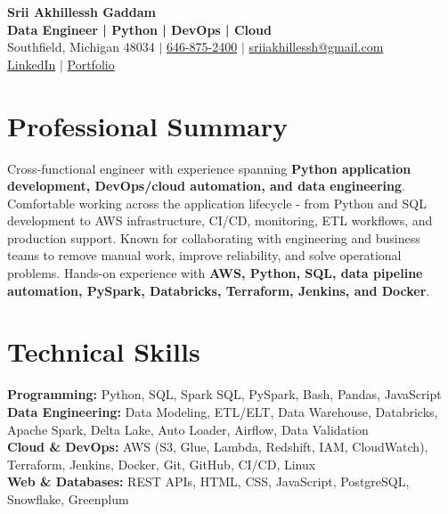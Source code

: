 \documentclass[letterpaper,10pt]{article}
\begin{document}
\fontsize{9.35pt}{10.45pt}\selectfont

\begin{center}
    {\LARGE \textbf{Srii Akhillessh Gaddam}} \\[-1pt]
    \textbf{Data Engineer | Python | DevOps | Cloud} \\[2pt]
    Southfield, Michigan 48034 $|$
    \href{tel:6468752400}{646-875-2400} $|$
    \href{mailto:sriiakhillessh@gmail.com}{sriiakhillessh@gmail.com} \\[1pt]
    \href{https://www.linkedin.com/in/srii-akhiilessh-gaddam-b48668191/}{LinkedIn} $|$
    \href{https://sriiakhillesshg.github.io/portfolio/}{Portfolio}
\end{center}
\vspace{-8pt}

\section{Professional Summary}
\small{Cross-functional engineer with experience spanning \textbf{Python application development, DevOps/cloud automation, and data engineering}. Comfortable working across the application lifecycle - from Python and SQL development to AWS infrastructure, CI/CD, monitoring, ETL workflows, and production support. Known for collaborating with engineering and business teams to remove manual work, improve reliability, and solve operational problems. Hands-on experience with \textbf{AWS, Python, SQL, data pipeline automation, PySpark, Databricks, Terraform, Jenkins, and Docker}.}

\section{Technical Skills}
\small{
\textbf{Programming:} Python, SQL, Spark SQL, PySpark, Bash, Pandas, JavaScript \\
\textbf{Data Engineering:} Data Modeling, ETL/ELT, Data Warehouse, Databricks, Apache Spark, Delta Lake, Auto Loader, Airflow, Data Validation \\
\textbf{Cloud \& DevOps:} AWS (S3, Glue, Lambda, Redshift, IAM, CloudWatch), Terraform, Jenkins, Docker, Git, GitHub, CI/CD, Linux \\
\textbf{Web \& Databases:} REST APIs, HTML, CSS, JavaScript, PostgreSQL, Snowflake, Greenplum
}
\end{document}
